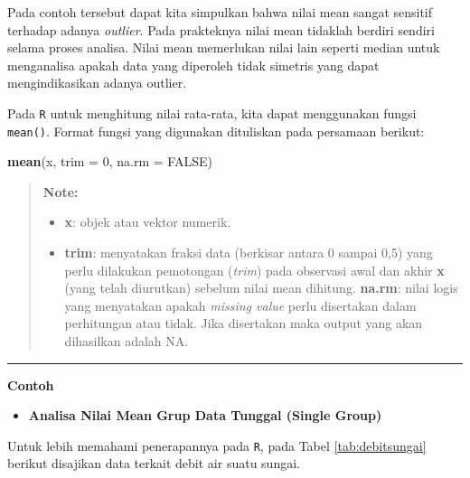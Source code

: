 \documentclass[]{book}
\newenvironment{Shaded}{\begin{snugshade}}{\end{snugshade}}
\newcommand{\KeywordTok}[1]{\textcolor[rgb]{0.13,0.29,0.53}{\textbf{#1}}}
\newcommand{\DataTypeTok}[1]{\textcolor[rgb]{0.13,0.29,0.53}{#1}}
\newcommand{\DecValTok}[1]{\textcolor[rgb]{0.00,0.00,0.81}{#1}}
\newcommand{\OtherTok}[1]{\textcolor[rgb]{0.56,0.35,0.01}{#1}}
\newcommand{\NormalTok}[1]{#1}
\providecommand{\tightlist}{%
  \setlength{\itemsep}{0pt}\setlength{\parskip}{0pt}}
\begin{document}
Pada contoh tersebut dapat kita simpulkan bahwa nilai mean sangat
sensitif terhadap adanya \emph{outlier}. Pada prakteknya nilai mean
tidaklah berdiri sendiri selama proses analisa. Nilai mean memerlukan
nilai lain seperti median untuk menganalisa apakah data yang diperoleh
tidak simetris yang dapat mengindikasikan adanya outlier.

Pada \texttt{R} untuk menghitung nilai rata-rata, kita dapat menggunakan
fungsi \texttt{mean()}. Format fungsi yang digunakan dituliskan pada
persamaan berikut:

\begin{Shaded}
\begin{Highlighting}[]
\KeywordTok{mean}\NormalTok{(x, }\DataTypeTok{trim =} \DecValTok{0}\NormalTok{, }\DataTypeTok{na.rm =} \OtherTok{FALSE}\NormalTok{)}
\end{Highlighting}
\end{Shaded}

\begin{quote}
\textbf{Note:}

\begin{itemize}
\tightlist
\item
  \textbf{x}: objek atau vektor numerik.
\item
  \textbf{trim}: menyatakan fraksi data (berkisar antara 0 sampai 0,5)
  yang perlu dilakukan pemotongan (\emph{trim}) pada observasi awal dan
  akhir \textbf{x} (yang telah diurutkan) sebelum nilai mean dihitung.
  \textbf{na.rm}: nilai logis yang menyatakan apakah \emph{missing
  value} perlu disertakan dalam perhitungan atau tidak. Jika disertakan
  maka output yang akan dihasilkan adalah NA.
\end{itemize}
\end{quote}

\begin{center}\rule{0.5\linewidth}{\linethickness}\end{center}

\textbf{Contoh}

\begin{itemize}
\tightlist
\item
  \textbf{Analisa Nilai Mean Grup Data Tunggal (Single Group)}
\end{itemize}

Untuk lebih memahami penerapannya pada \texttt{R}, pada Tabel
\ref{tab:debitsungai} berikut disajikan data terkait debit air suatu
sungai.
\end{document}
